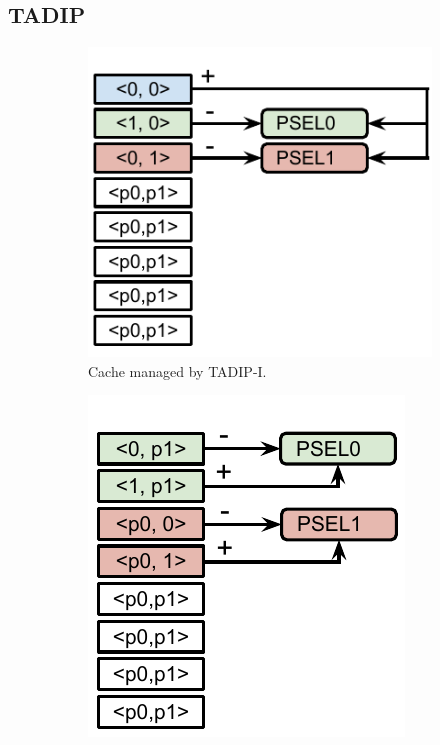 \subsection{TADIP}
\label{sec:algorithms:tadip}

\begin{figure}[H]
    \centering
    \begin{subfigure}[b]{0.45\textwidth}
        \includegraphics[width=\textwidth]{figures/algorithms/TADIP-I}
        \caption{Cache managed by TADIP-I.}
        \label{fig:algorithms:tadip:isolated}
    \end{subfigure}
    \begin{subfigure}[b]{0.45\textwidth}
        \includegraphics[width=\textwidth]{figures/algorithms/TADIP-F}

\end{subfigure}
\end{figure}
